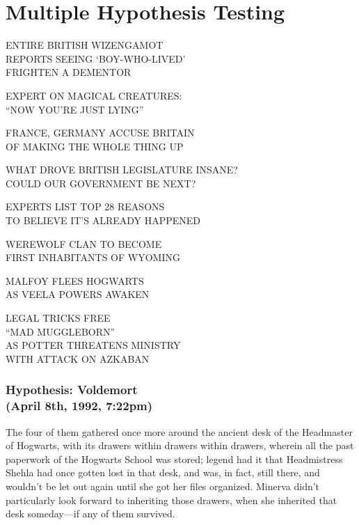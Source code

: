 \chapter{Multiple Hypothesis Testing}

\begin{headlines}


\label{Toronto Magical Tribune:}

ENTIRE BRITISH WIZENGAMOT\\
REPORTS SEEING `BOY-WHO-LIVED'\\
FRIGHTEN A DEMENTOR

EXPERT ON MAGICAL CREATURES:\\
``NOW YOU'RE JUST LYING''

FRANCE, GERMANY ACCUSE BRITAIN\\
OF MAKING THE WHOLE THING UP

\label{New Zealand Spellcrafter's Diurnal Notice:}

WHAT DROVE BRITISH LEGISLATURE INSANE?\\
COULD OUR GOVERNMENT BE NEXT?

EXPERTS LIST TOP 28 REASONS\\
TO BELIEVE IT'S ALREADY HAPPENED

\label{American Mage:}

WEREWOLF CLAN TO BECOME\\
FIRST INHABITANTS OF WYOMING

\label{The Quibbler:}

MALFOY FLEES HOGWARTS\\
AS VEELA POWERS AWAKEN

\label{Daily Prophet:}

LEGAL TRICKS FREE\\
``MAD MUGGLEBORN''\\
AS POTTER THREATENS MINISTRY\\
WITH ATTACK ON AZKABAN
\end{headlines}
\sbreakit
\subsection{Hypothesis: Voldemort\\
(April 8th, 1992, 7:22pm)}

The four of them gathered once more around the ancient desk of the Headmaster 
of Hogwarts, with its drawers within drawers within drawers, wherein all the 
past paperwork of the Hogwarts School was stored; legend had it that 
Headmistress Shehla had once gotten lost in that desk, and was, in fact, still 
there, and wouldn't be let out again until she got her files organized. Minerva 
didn't particularly look forward to inheriting those drawers, when she 
inherited that desk someday---if any of them survived.

